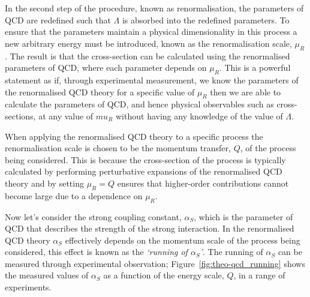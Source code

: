 In the second step of the procedure, known as renormalisation,
the parameters of QCD are redefined such that $\Lambda$ is absorbed into the redefined parameters.
To ensure that the parameters maintain a physical dimensionality in this process
a new arbitrary energy must be introduced, known as the renormalisation scale, $\mu_R$.
The result is that the cross-section can be calculated using the renormalised parameters of QCD, where each parameter depends on $\mu_R$.
This is a powerful statement as if, through experimental measurement, we know the parameters of the
renormalised QCD theory for a specific value of $\mu_R$ then we are able to calculate the parameters of QCD,
and hence physical observables such as cross-sections, at any value of $mu_R$ without having any knowledge of the value of $\Lambda$.

When applying the renormalised QCD theory to a specific process the renormalisation scale is chosen to be the momentum transfer, $Q$, of the process being considered.
This is because the cross-section of the process is typically calculated by performing perturbative expansions of the renormalised QCD theory
and by setting $\mu_R = Q$ ensures that higher-order contributions cannot become large due to a dependence on $\mu_R$.

Now let's consider the strong coupling constant, $\alpha_S$, which is the parameter of QCD that describes the strength of the strong interaction.
In the renormalised QCD theory $\alpha_S$ effectively depends on the momentum scale of the process being considered,
this effect is known as the \textit{`running of $\alpha_S$'}.
The running of $\alpha_{S}$ can be measured through experimental observation;
Figure~\ref{fig:theo-qcd_running} shows the measured values of $\alpha_S$
as a function of the energy scale, $Q$, in a range of experiments.

